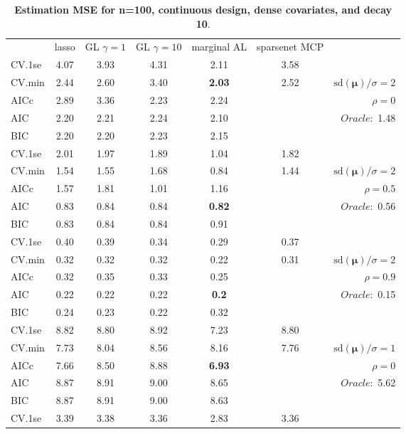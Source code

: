 \clearpage
\begin{table}\vspace{-.5cm}
\caption[l]{ { \bf Estimation MSE for n=100, continuous design, 
dense covariates, and  decay  10}.}
\vspace{-.5cm}
\footnotesize{}
\begin{center}
\begin{tabular}{l*{5}{c}|r}
& lasso & GL $\gamma=1$ & GL $\gamma=10$ & marginal AL & sparsenet MCP  & \\
 \cline{1-7}
CV.1se & 4.07 & 3.93 & 4.31 & 2.11 & 3.58 & \\
CV.min & 2.44 & 2.60 & 3.40 & {\bf 2.03} & 2.52 &  $\mathrm{sd}(\mathbf{\mu})/\sigma=2$ \\
AICc & 2.89 & 3.36 & 2.23 & 2.24 & & $\rho=0$ \\
AIC & 2.20 & 2.21 & 2.24 & 2.10 & &  \multirow{2}{*}{$Oracle: $ 1.48} \\
BIC & 2.20 & 2.20 & 2.23 & 2.15 & &  \\
 \hline 
CV.1se & 2.01 & 1.97 & 1.89 & 1.04 & 1.82 & \\
CV.min & 1.54 & 1.55 & 1.68 & 0.84 & 1.44 &  $\mathrm{sd}(\mathbf{\mu})/\sigma=2$ \\
AICc & 1.57 & 1.81 & 1.01 & 1.16 & & $\rho=0.5$ \\
AIC & 0.83 & 0.84 & 0.84 & {\bf 0.82} & &  \multirow{2}{*}{$Oracle: $ 0.56} \\
BIC & 0.83 & 0.84 & 0.84 & 0.91 & &  \\
 \hline 
CV.1se & 0.40 & 0.39 & 0.34 & 0.29 & 0.37 & \\
CV.min & 0.32 & 0.32 & 0.32 & 0.22 & 0.31 &  $\mathrm{sd}(\mathbf{\mu})/\sigma=2$ \\
AICc & 0.32 & 0.35 & 0.33 & 0.25 & & $\rho=0.9$ \\
AIC & 0.22 & 0.22 & 0.22 & {\bf 0.2} & &  \multirow{2}{*}{$Oracle: $ 0.15} \\
BIC & 0.24 & 0.23 & 0.22 & 0.32 & &  \\
 \hline 
CV.1se & 8.82 & 8.80 & 8.92 & 7.23 & 8.80 & \\
CV.min & 7.73 & 8.04 & 8.56 & 8.16 & 7.76 &  $\mathrm{sd}(\mathbf{\mu})/\sigma=1$ \\
AICc & 7.66 & 8.50 & 8.88 & {\bf 6.93} & & $\rho=0$ \\
AIC & 8.87 & 8.91 & 9.00 & 8.65 & &  \multirow{2}{*}{$Oracle: $ 5.62} \\
BIC & 8.87 & 8.91 & 9.00 & 8.63 & &  \\
 \hline 
CV.1se & 3.39 & 3.38 & 3.36 & 2.83 & 3.36 & \\

\end{tabular}
\end{center}
\end{table}
